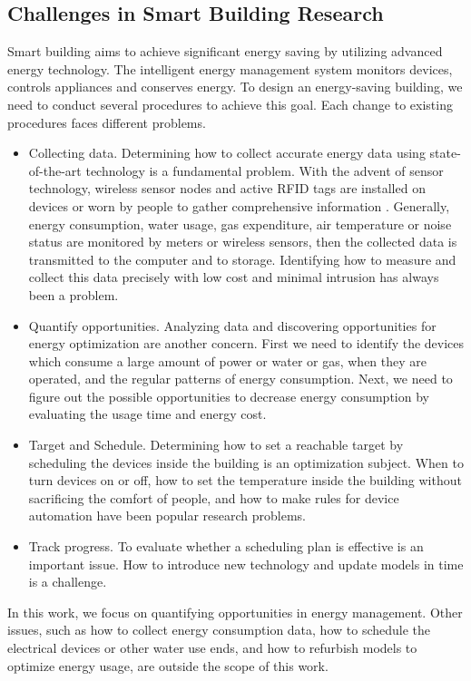 \subsection{Challenges in Smart Building Research}
Smart building aims to achieve significant energy saving by utilizing advanced energy technology. 
The intelligent energy management system monitors devices, controls appliances and conserves energy. To design an energy-saving building, we need to conduct several procedures to achieve this goal. Each change to existing procedures faces different problems. 
\begin{itemize}
  \item Collecting data. 
Determining how to collect accurate energy data using state-of-the-art technology is a fundamental problem. 
  With the advent of sensor technology, wireless sensor nodes and active RFID tags are 
  installed on devices or worn by people to gather comprehensive information \cite{vullers2010energy}. 
Generally, energy consumption, water usage, gas expenditure, air temperature or noise status are monitored by meters or wireless sensors, then the collected data is transmitted to the computer and to storage. 
Identifying how to measure and collect this data precisely with low cost and minimal intrusion has always been a problem. 
  \item Quantify opportunities.
 Analyzing data and discovering opportunities for energy optimization are another concern. 
First we need to identify the devices which consume a large amount of power or water or gas, when they are operated, and the regular patterns of energy consumption. Next, we need to figure out the possible opportunities to decrease energy consumption by evaluating the usage time and energy cost. 
\item Target and Schedule. 
Determining how to set  a reachable target by scheduling the devices inside the building is an optimization subject. When to turn devices on or off, how to set the temperature inside the building without sacrificing the comfort of people, and how to make rules for device automation have been popular research problems. 
\item Track progress.
To evaluate whether a scheduling plan is effective is an important issue. 
How to introduce new technology and update models in time is a challenge. 
\end{itemize} 

In this work, we focus on quantifying opportunities in energy management. Other issues, such as how to collect energy consumption data, how to schedule the electrical devices or other water use ends, and how to refurbish models to optimize energy usage, are outside the scope of this work. 


